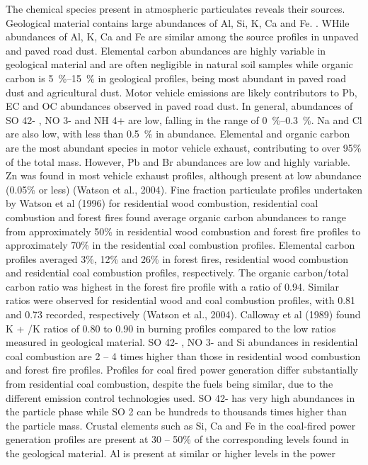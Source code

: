 \documentclass{nwureport}
\begin{document}
The chemical species present in atmospheric particulates reveals their sources. Geological material contains
large abundances of Al, Si, K, Ca and Fe. . WHile abundances of Al, K, Ca and Fe are similar among the
source profiles in unpaved and paved road dust. Elemental carbon abundances are highly variable in
geological material and are often negligible in natural soil samples while organic carbon is \SIrange{5}{15}{\percent} in
geological profiles, being most abundant in paved road dust and agricultural dust. Motor vehicle emissions
are likely contributors to Pb, EC and OC abundances observed in paved road dust. In general, abundances
of SO 42- , NO 3- and NH 4+ are low, falling in the range of \SIrange{0}{0.3}{\percent}. Na and Cl are also low, with less than \SI{0.5}{\percent}
in abundance. Elemental and organic carbon are the most abundant species in motor vehicle exhaust,
contributing to over 95\% of the total mass. However, Pb and Br abundances are low and highly variable. Zn
was found in most vehicle exhaust profiles, although present at low abundance (0.05\% or less) (Watson et
al., 2004). Fine fraction particulate profiles undertaken by Watson et al (1996) for residential wood
combustion, residential coal combustion and forest fires found average organic carbon abundances to range
from approximately 50\% in residential wood combustion and forest fire profiles to approximately 70\% in the
residential coal combustion profiles. Elemental carbon profiles averaged 3\%, 12\% and 26\% in forest fires,
residential wood combustion and residential coal combustion profiles, respectively. The organic carbon/total
carbon ratio was highest in the forest fire profile with a ratio of 0.94. Similar ratios were observed for
residential wood and coal combustion profiles, with 0.81 and 0.73 recorded, respectively (Watson et al.,
2004). Calloway et al (1989) found K + /K ratios of 0.80 to 0.90 in burning profiles compared to the low ratios
measured in geological material. SO 42- , NO 3- and Si abundances in residential coal combustion are 2 – 4
times higher than those in residential wood combustion and forest fire profiles.
Profiles for coal fired power generation differ substantially from residential coal combustion, despite the fuels
being similar, due to the different emission control technologies used. SO 42- has very high abundances in the
particle phase while SO 2 can be hundreds to thousands times higher than the particle mass. Crustal
elements such as Si, Ca and Fe in the coal-fired power generation profiles are present at 30 – 50\% of the
corresponding levels found in the geological material. Al is present at similar or higher levels in the power
\end{document}
